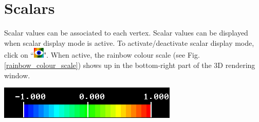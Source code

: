
\chapter{Scalars}
\minitoc 

\noindent
\begin{minipage}{0.5\textwidth}
Scalar values can be associated to each vertex. Scalar values
can be displayed when scalar display mode is active. To
activate/deactivate scalar display mode, click on ``\includegraphics[scale=0.7]{images/pixmap/show_color_scale.png}".
When active, the rainbow colour scale (see Fig. \ref{rainbow_colour_scale}) shows up in the
bottom-right part of the 3D rendering window.
\end{minipage}    
\begin{minipage}{0.5\textwidth}\centering
  \includegraphics[scale=0.5]{images/Scalars_renreding/Colour scale.png}
\label{rainbow_colour_scale}
 \end{minipage} 
\noindent



